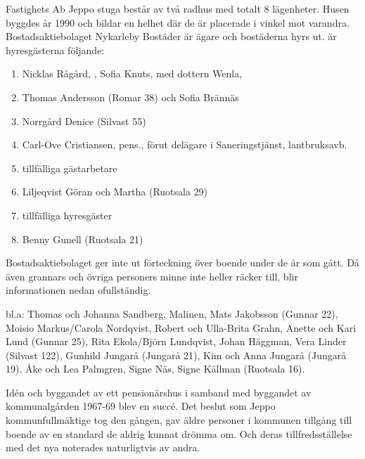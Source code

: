 %
Fastighets Ab Jeppo stuga består av två radhus med totalt 8 lägenheter. Husen byggdes år 1990 och bildar en helhet där de är placerade i vinkel mot varandra. Bostadsaktiebolaget Nykarleby Bostäder är ägare och bostäderna hyrs ut.
 är hyresgästerna följande:
\begin{enumerate}
  \item Nicklas Rågård, , Sofia Knuts,  med dottern Wenla, 
  \item Thomas Andersson (Romar 38) och Sofia Brännäs
  \item Norrgård Denice (Silvast 55)
  \item Carl-Ove Cristiansen, pens., förut delägare i Saneringstjänst, lantbruksavb.
  \item tillfälliga gästarbetare
  \item Liljeqvist Göran och Martha (Ruotsala 29)
  \item tillfälliga hyresgäster
  \item Benny Gunell (Ruotsala 21)
\end{enumerate}

Bostadsaktiebolaget ger inte ut förteckning över boende under de år som gått. Då även grannars och övriga personers minne inte heller räcker till, blir informationen nedan ofullständig.

 bl.a: Thomas och Johanna Sandberg, Malinen, Mats Jakobsson (Gunnar 22), Moisio Markus/Carola Nordqvist, Robert och Ulla-Brita Grahn, Anette och Kari Lund (Gunnar 25), Rita Ekola/Björn Lundqvist, Johan Häggman,  Vera Linder (Silvast 122), Gunhild Jungarå (Jungarå 21), Kim och Anna Jungarå (Jungarå 19), Åke och Lea Palmgren, Signe Näs, Signe Källman (Ruotsala 16). \jhvspace{}



%



%
Idén och byggandet av ett pensionärshus i samband med byggandet av kommunalgården 1967-69 blev en succé. Det beslut som Jeppo kommunfullmäktige tog den gången, gav äldre personer i kommunen tillgång till boende av en standard de aldrig kunnat drömma om. Och deras tillfredsställelse med det nya noterades naturligtvis av andra.


